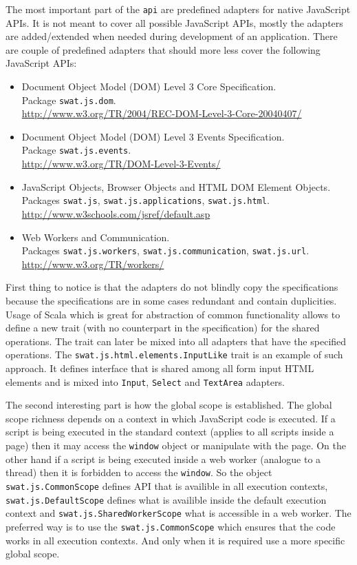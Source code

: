 \documentclass[12pt,a4paper]{report}
\begin{document}
The most important part of the \texttt{api} are predefined adapters for native JavaScript APIs. It is not meant to cover all possible JavaScript APIs, mostly the adapters are added/extended when needed during development of an application. There are couple of predefined adapters that should more less cover the following JavaScript APIs:

\begin{itemize}
\item Document Object Model (DOM) Level 3 Core Specification.\\
Package \texttt{swat.js.dom}.\\
\url{http://www.w3.org/TR/2004/REC-DOM-Level-3-Core-20040407/}
\item Document Object Model (DOM) Level 3 Events Specification.\\
Package \texttt{swat.js.events}.\\
\url{http://www.w3.org/TR/DOM-Level-3-Events/}
\item JavaScript Objects, Browser Objects and HTML DOM Element Objects.\\
Packages \texttt{swat.js}, \texttt{swat.js.applications}, \texttt{swat.js.html}.\\
\url{http://www.w3schools.com/jsref/default.asp}
\item Web Workers and Communication.\\
Packages \texttt{swat.js.workers}, \texttt{swat.js.communication}, \texttt{swat.js.url}.\\
\url{http://www.w3.org/TR/workers/}
\end{itemize}

First thing to notice is that the adapters do not blindly copy the specifications because the specifications are in some cases redundant and contain duplicities. Usage of Scala which is great for abstraction of common functionality allows to define a new trait (with no counterpart in the specification) for the shared operations. The trait can later be mixed into all adapters that have the specified operations. The \texttt{swat.js.html.elements.InputLike} trait is an example of such approach. It defines interface that is shared among all form input HTML elements and is mixed into \texttt{Input}, \texttt{Select} and \texttt{TextArea} adapters.

The second interesting part is how the global scope is established. The global scope richness depends on a context in which JavaScript code is executed. If a script is being executed in the standard context (applies to all scripts inside a page) then it may access the \texttt{window} object or manipulate with the page. On the other hand if a script is being executed inside a web worker (analogue to a thread) then it is forbidden to access the \texttt{window}. So the object \texttt{swat.js.CommonScope} defines API that is availible in all execution contexts, \texttt{swat.js.DefaultScope} defines what is availible inside the default execution context and \texttt{swat.js.SharedWorkerScope} what is accessible in a web worker. The preferred way is to use the \texttt{swat.js.CommonScope} which ensures that the code works in all execution contexts. And only when it is required use a more specific global scope.
\end{document}
